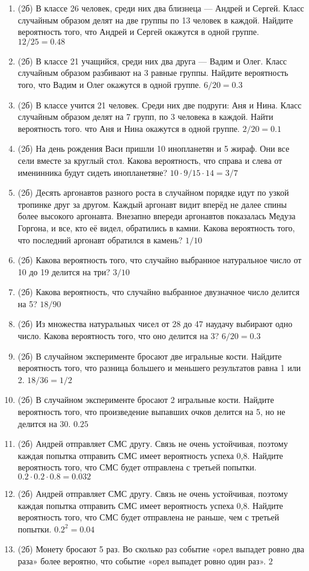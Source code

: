 \documentclass[a4paper, 12pt]{article}
\begin{document}
\begin{enumerate}
\item (2б) В классе 26 человек, среди них два близнеца — Андрей и Сергей. Класс случайным образом делят на две группы по 13 человек в каждой. 
Найдите вероятность того, что Андрей и Сергей окажутся в одной группе. $12/25 = 0.48$
\item (2б) В классе 21 учащийся, среди них два друга — Вадим и Олег. Класс случайным образом разбивают на 3 равные группы. Найдите вероятность того, 
что Вадим и Олег окажутся в одной группе. $6/20=0.3$
\item (2б) В классе учится 21 человек. Среди них две подруги: Аня и Нина. Класс случайным образом делят на 7 групп, по 3 человека в каждой. 
Найти вероятность того. что Аня и Нина окажутся в одной группе. $2/20=0.1$
\item (2б) На день рождения Васи пришли 10 инопланетян и 5 жираф. Они все сели вместе за круглый стол. 
Какова вероятность, что справа и слева от именинника будут сидеть инопланетяне? $10 \cdot 9 / 15\cdot 14 = 3/7$
\item (2б) Десять аргонавтов разного роста в случайном порядке идут по узкой тропинке друг за другом. 
Каждый аргонавт видит вперёд не далее спины более высокого аргонавта. 
Внезапно впереди аргонавтов показалась Медуза Горгона, и все, кто её видел, обратились в камни. 
Какова вероятность того, что последний аргонавт обратился в камень? $1/10$
\item (2б) Какова вероятность того, что случайно выбранное натуральное число от 10 до 19 делится на три? $3/10$
\item (2б) Какова вероятность, что случайно выбранное двузначное число делится на 5? $18/90$
\item (2б) Из множества натуральных чисел от 28 до 47 наудачу выбирают одно число. Какова вероятность того, что оно делится на 3? $6/20=0.3$
\item (2б) В случайном эксперименте бросают две игральные кости. Найдите вероятность того, что разница большего и меньшего результатов равна 1 или 2. $18/36=1/2$
\item (2б) В случайном эксперименте бросают 2 игральные кости. Найдите вероятность того, что произведение выпавших очков делится на 5, 
но не делится на 30. $0.25$
\item (2б) Андрей отправляет СМС другу. Связь не очень устойчивая, поэтому каждая попытка отправить СМС имеет вероятность успеха 0,8. 
Найдите вероятность того, что СМС будет отправлена с третьей попытки. $0.2 \cdot 0.2 \cdot 0.8 = 0.032$
\item (2б) Андрей отправляет СМС другу. Связь не очень устойчивая, поэтому каждая попытка отправить СМС имеет вероятность успеха 0,8. 
Найдите вероятность того, что СМС будет отправлена не раньше, чем с третьей попытки. $0.2^2 = 0.04$
\item (2б) Монету бросают 5 раз. Во сколько раз событие «орел выпадет ровно два раза» более вероятно, что событие «орел выпадет ровно один раз». $2$


\end{enumerate}
\end{document}
